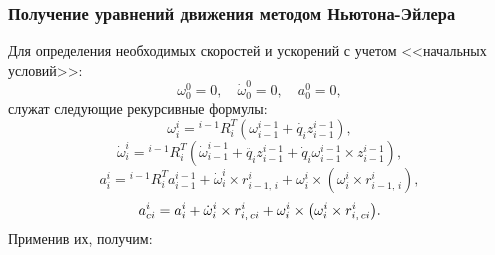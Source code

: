 \subsubsection{Получение уравнений движения методом Ньютона-Эйлера}
Для определения необходимых скоростей и ускорений с учетом <<начальных условий>>:
\begin{equation}
    \omega^0_0=0, \quad \dot\omega^0_0=0, \quad a^0_0=0,
\end{equation}
служат следующие рекурсивные формулы:
\begin{equation}
    \omega^i_i = {}^{i-1}R_i^T\left(\omega^{i-1}_{i-1} + \dot{q_i}z^{i-1}_{i-1}\right)\!,
\end{equation}
\begin{equation}
    \dot{\omega}^i_i = {}^{i-1}R_i^T\left(\dot{\omega}^{i-1}_{i-1} + \ddot{q_i}z^{i-1}_{i-1} + \dot{q}_i\omega^{i-1}_{i-1} \times z^{i-1}_{i-1}\right)\!,
\end{equation}
\begin{equation}
    a^i_i = {}^{i-1}R_i^Ta^{i-1}_{i-1} + \dot{\omega}^i_i \times r^i_{i-1,\,i} + \omega^i_i \times \left(\omega^i_i \times r^i_{i-1,\,i}\right)\!,
\end{equation}
\begin{equation}
    a^i_{ci} = a^i_i + \dot{\omega}^i_i \times r^i_{i,\,ci} + \omega^i_i \times \left(\omega^i_i \times r^i_{i,\,ci}\right)\!\ldotp
\end{equation}
Применив их, получим:
